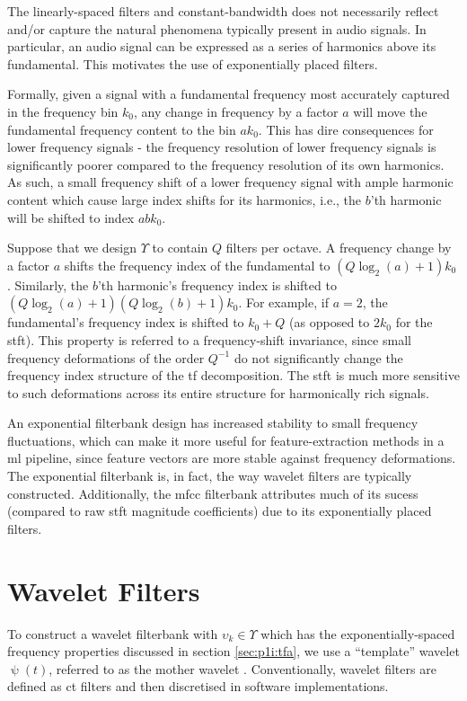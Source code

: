 The linearly-spaced filters and constant-bandwidth does not necessarily reflect and/or capture the natural phenomena typically present in audio signals. In particular, an audio signal can be expressed as a series of harmonics above its fundamental. This motivates the use of exponentially placed filters.

Formally, given a signal with a fundamental frequency most accurately captured in the frequency bin $k_0$, any change in frequency by a factor $a$ will move the fundamental frequency content to the bin $a k_0$. This has dire consequences for lower frequency signals - the frequency resolution of lower frequency signals is significantly poorer compared to the frequency resolution of its own harmonics. As such, a small frequency shift of a lower frequency signal with ample harmonic content which cause large index shifts for its harmonics, i.e., the $b$'th harmonic will be shifted to index $a b k_0$.

Suppose that we design $\Upsilon$ to contain $Q$ filters per octave. A frequency change by a factor $a$ shifts the frequency index of the fundamental to $(Q\log_2 (a) + 1) k_0$. Similarly, the $b$'th harmonic's frequency index is shifted to $(Q\log_2 (a) + 1) (Q\log_2 (b) + 1) k_0$. For example, if $a=2$, the fundamental's frequency index is shifted to $k_0 + Q$ (as opposed to $2 k_0$ for the \ac{stft}). This property is referred to a frequency-shift invariance, since small frequency deformations of the order $Q^{-1}$ do not significantly change the frequency index structure of the \ac{tf} decomposition. The \ac{stft} is much more sensitive to such deformations across its entire structure for harmonically rich signals.

An exponential filterbank design has increased stability to small frequency fluctuations, which can make it more useful for feature-extraction methods in a \ac{ml} pipeline, since feature vectors are more stable against frequency deformations. The exponential filterbank is, in fact, the way wavelet filters are typically constructed. Additionally, the \ac{mfcc} filterbank attributes much of its sucess (compared to raw \ac{stft} magnitude coefficients) due to its exponentially placed filters.

\section{Wavelet Filters}
\label{sec:p1i:wavelets}

To construct a wavelet filterbank with $\upsilon_k \in \Upsilon$ which has the exponentially-spaced frequency properties discussed in section \ref{sec:p1i:tfa}, we use a ``template'' wavelet $\uppsi(t)$, referred to as the mother wavelet \cite{waveletbook}. Conventionally, wavelet filters are defined as \ac{ct} filters and then discretised in software implementations. 


